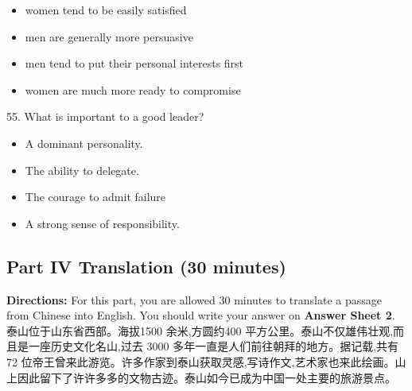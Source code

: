 \documentclass[UTF8,11pt]{ctexart}
\begin{document}
\begin{itemize}[leftmargin=2em,itemsep=.2em,topsep=.4em]\item[A.] women tend to be easily satisfied
\item[B.] men are generally more persuasive
\item[C.] men tend to put their personal interests first
\item[D.] women are much more ready to compromise
\end{itemize}

55. What is important to a good leader?


\begin{itemize}[leftmargin=2em,itemsep=.2em,topsep=.4em]\item[A.] A dominant personality.
\item[B.] The ability to delegate.
\item[C.] The courage to admit failure
\item[D.] A strong sense of responsibility.
\end{itemize}

\subsection*{\textbf{Part} IV \textbf{Translation} \textbf{(30 minutes)}}


\textbf{Directions:} For this part, you are allowed 30 minutes to translate a passage from Chinese into English. You should write your answer on\textbf{ Answer Sheet 2}. 泰山位于山东省西部。海拔1500 余米,方圆约400 平方公里。泰山不仅雄伟壮观,而且是一座历史文化名山,过去 3000 多年一直是人们前往朝拜的地方。据记载,共有72 位帝王曾来此游览。许多作家到泰山获取灵感,写诗作文,艺术家也来此绘画。山上因此留下了许许多多的文物古迹。泰山如今已成为中国一处主要的旅游景点。
\end{document}
